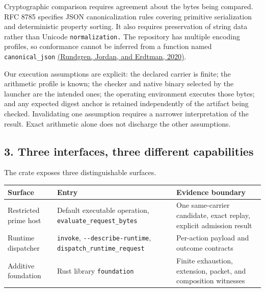 \documentclass[
  11pt,
]{article}
\newcommand{\passthrough}[1]{#1}
\begin{document}
Cryptographic comparison requires agreement about the bytes being
compared. RFC 8785 specifies JSON canonicalization rules covering
primitive serialization and deterministic property sorting. It also
requires preservation of string data rather than Unicode
\nolinkurl{normalization.} The repository has multiple encoding
profiles, so conformance cannot be inferred from a function named
\nolinkurl{canonical_json}
\href{https://doi.org/10.17487/RFC8785}{(Rundgren, Jordan, and Erdtman,
2020)}.

Our execution assumptions are explicit: the declared carrier is finite;
the arithmetic profile is known; the checker and native binary selected
by the launcher are the intended ones; the operating environment
executes those bytes; and any expected digest anchor is retained
independently of the artifact being checked. Invalidating one assumption
requires a narrower interpretation of the result. Exact arithmetic alone
does not discharge the other assumptions.

\subsection{3. Three interfaces, three different
capabilities}\label{three-interfaces-three-different-capabilities}

The crate exposes three distinguishable surfaces.

\begin{longtable}[]{@{}
  >{\raggedright\arraybackslash}p{}
  >{\raggedright\arraybackslash}p{}
  >{\raggedright\arraybackslash}p{}@{}}
\toprule\noalign{}
\begin{minipage}[b]{\linewidth}\raggedright
Surface
\end{minipage} & \begin{minipage}[b]{\linewidth}\raggedright
Entry
\end{minipage} & \begin{minipage}[b]{\linewidth}\raggedright
Evidence boundary
\end{minipage} \\
\midrule\noalign{}
\endhead
\bottomrule\noalign{}
\endlastfoot
Restricted prime host & Default executable operation,
\nolinkurl{evaluate_request_bytes} & One same-carrier candidate, exact
replay, explicit admission result \\
Runtime dispatcher & \passthrough{\lstinline!invoke!},
\nolinkurl{--describe-runtime}, \nolinkurl{dispatch_runtime_request} &
Per-action payload and outcome contracts \\
Additive foundation & Rust library \passthrough{\lstinline!foundation!}
& Finite exhaustion, extension, packet, and composition witnesses \\
\end{longtable}
\end{document}
